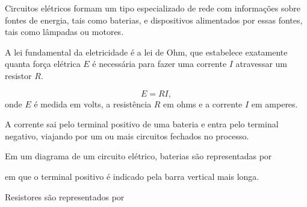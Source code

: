 \documentclass{beamer}
\begin{document}
    \begin{frame}
        Circuitos elétricos formam um tipo especializado de rede com informações sobre fontes de energia, \pause tais como baterias, \pause e dispositivos alimentados por essas fontes, tais como lâmpadas ou motores.\pause

        \vspace{1cm}

        A lei fundamental da eletricidade é a \textrm{lei de Ohm}, \pause que estabelece exatamente quanta força elétrica $E$ \pause é necessária para fazer uma corrente $I$ \pause atravessar um resistor $R$.\pause

        \vspace{1cm}

        \begin{definicao}
            \[
                E = RI,
            \] 
            onde $E$ é medida em \textrm{volts}, \pause a resistência $R$ em \textrm{ohms} \pause e a corrente $I$ em \textrm{amperes}.
        \end{definicao}
        
    \end{frame}

    \begin{frame}

        A corrente sai pelo terminal positivo de uma bateria \pause e entra pelo terminal negativo, \pause viajando por um ou mais circuitos fechados no processo.\pause

        \vspace{1cm}

        Em um diagrama de um circuito elétrico, baterias são representadas por
        \begin{center}
        \end{center}\pause
        em que o terminal positivo é indicado pela barra vertical mais longa.\pause

        \vspace{1cm}

        Resistores são representados por
        \begin{center}
        \end{center}
    \end{frame}
\end{document}
